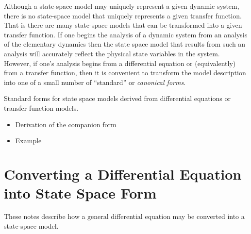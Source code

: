 \def\FileDate{98/10/14}
\def\FileVersion{1.0}

Although a state-space model may uniquely represent a given
dynamic system, there is no state-space model that uniquely
represents a given transfer function. That is there are many
state-space models that can be transformed into a given transfer
function. If one begins the analysis of a dynamic system from an
analysis of the elementary dynamics then the state space model
that results from such an analysis will accurately reflect the
physical state variables in the system. However, if one's analysis
begins from a differential equation or (equivalently) from a
transfer function, then it is convenient to transform the model
description into one of a small number of ``standard'' or
\emph{canonical forms}.

\begin{slide}
	Standard forms for state space models derived from differential equations or transfer function models.
	\begin{itemize}
		\item Derivation of the companion form
		\item Example
	\end{itemize}
\end{slide}



\section*{Converting a Differential Equation into State Space Form}
These notes describe how a general differential equation may be
converted into a state-space model.

